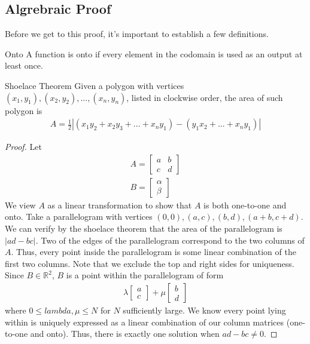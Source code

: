 \documentclass[11pt]{article}
\begin{document}
\subsection{Algrebraic Proof}
Before we get to this proof, it's important to establish a few definitions.

\begin{definitionbox}{Onto}
    A function is onto if every element in the codomain is used as an output at least once.
\end{definitionbox}

\begin{theorembox}{Shoelace Theorem}
    Given a polygon with vertices $(x_1,y_1), (x_2,y_2),..., (x_n,y_n)$, listed in clockwise order, the area of such polygon is
    \begin{align*}
        A = \frac{1}{2} |(x_1y_2+x_2y_3+...+x_ny_1)-(y_1x_2+...+x_ny_1)|
    \end{align*}
\end{theorembox}

\begin{proof}
    Let
    \begin{align*}
        A =
        \begin{bmatrix}
            a & b \\
            c & d
        \end{bmatrix} \\
        B = 
        \begin{bmatrix}
            \alpha \\
            \beta
        \end{bmatrix}
    \end{align*}
    We view $A$ as a linear transformation to show that $A$ is both one-to-one and onto. Take a parallelogram with vertices $(0,0), (a,c), (b,d), (a+b,c+d)$. We can verify by the shoelace theorem that the area of the parallelogram is $|ad-bc|$. Two of the edges of the parallelogram correspond to the two columns of $A$. Thus, every point inside the parallelogram is some linear combination of the first two columns. Note that we exclude the top and right sides for uniqueness. Since $B \in \mathbb{R}^2$, $B$ is a point within the parallelogram of form
    \begin{align*}
        \lambda
        \begin{bmatrix}
            a \\
            c
        \end{bmatrix}
        + \mu
        \begin{bmatrix}
            b \\
            d
        \end{bmatrix}
    \end{align*}
    where $0 \leq lambda, \mu \leq N$ for $N$ sufficiently large. We know every point lying within is uniquely expressed as a linear combination of our column matrices (one-to-one and onto). Thus, there is exactly one solution when $ad-bc \neq 0$.
\end{proof}
\end{document}
